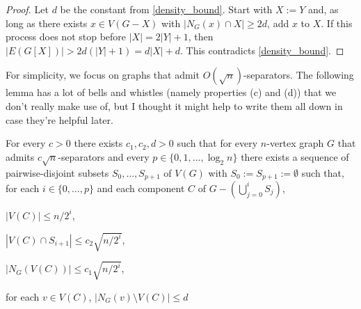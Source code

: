 \documentclass{patmorin}
\renewcommand{\ge}{\geqslant}
\renewcommand{\le}{\leqslant}
\begin{document}
\begin{proof}
  Let $d$ be the constant from \cref{density_bound}.
  Start with $X:=Y$ and, as long as there exists $x\in V(G-X)$ with $|N_G(x)\cap X|\ge 2d$, add $x$ to $X$.  If this process does not stop before $|X|=2|Y|+1$, then $|E(G[X])|> 2d(|Y|+1)=d|X|+d$.  This contradicts \cref{density_bound}.
\end{proof}

For simplicity, we focus on graphs that admit $O(\sqrt{n})$-separators.  The following lemma has a lot of bells and whistles (namely properties (c) and (d)) that we don't really make use of, but I thought it might help to write them all down in case they're helpful later.

\begin{lem}\label{recursive_separator}
  For every $c>0$ there exists $c_1,c_2,d>0$ such that for every $n$-vertex graph $G$ that admits $c\sqrt{n}$-separators and every $p\in\{0,1,\ldots,\log_2 n\}$ there exists a sequence of pairwise-disjoint subsets $S_0,\ldots,S_{p+1}$ of $V(G)$ with $S_0:=S_{p+1}:=\emptyset$ such that, for each $i\in\{0,\ldots,p\}$ and each component $C$ of $G-(\bigcup_{j=0}^i S_j)$,
  \begin{compactenum}[(a)]
    \item $|V(C)|\le n/2^i$,
    \item $|V(C)\cap S_{i+1}|\le c_2\sqrt{n/2^i}$,
    \item $|N_G(V(C))|\le c_1\sqrt{n/2^i}$,
    \item for each $v\in V(C)$, $|N_G(v)\setminus V(C)|\le d$
  \end{compactenum}
\end{lem}
\end{document}
